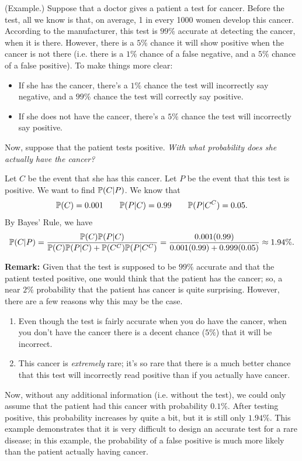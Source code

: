 \begin{mdframed}[]
    (Example.) Suppose that a doctor gives a patient a test for cancer. Before the test, all we know is that, on average, 1 in every 1000 women develop this cancer. According to the manufacturer, this test is $99\%$ accurate at detecting the cancer, when it is there. However, there is a $5\%$ chance it will show positive when the cancer is not there (i.e. there is a $1\%$ chance of a false negative, and a $5\%$ chance of a false positive). To make things more clear:
    \begin{itemize}
        \item If she has the cancer, there's a $1\%$ chance the test will incorrectly say negative, and a $99\%$ chance the test will correctly say positive. 
        \item If she does not have the cancer, there's a $5\%$ chance the test will incorrectly say positive.
    \end{itemize}
    Now, suppose that the patient tests positive. \emph{With what probability does she actually have the cancer?}

    \begin{mdframed}[]
        Let $C$ be the event that she has this cancer. Let $P$ be the event that this test is positive. We want to find $\mathbb{P}(C | P)$. We know that 
        \[\mathbb{P}(C) = 0.001 \qquad \mathbb{P}(P | C) = 0.99 \qquad \mathbb{P}(P | C^C) = 0.05.\]
        By Bayes' Rule, we have 
        \[\mathbb{P}(C | P) = \frac{\mathbb{P}(C) \mathbb{P}(P | C)}{\mathbb{P}(C) \mathbb{P}(P | C) + \mathbb{P}(C^C) \mathbb{P}(P | C^C)} = \frac{0.001(0.99)}{0.001(0.99) + 0.999(0.05)} \approx 1.94\%.\]
    \end{mdframed}
\end{mdframed}
\textbf{Remark:} Given that the test is supposed to be $99\%$ accurate and that the patient tested positive, one would think that the patient has the cancer; so, a near $2\%$ probability that the patient has cancer is quite surprising. However, there are a few reasons why this may be the case.
\begin{enumerate}
    \item Even though the test is fairly accurate when you do have the cancer, when you don't have the cancer there is a decent chance ($5\%$) that it will be incorrect.
    \item This cancer is \emph{extremely} rare; it's so rare that there is a much better chance that this test will incorrectly read positive than if you actually have cancer. 
\end{enumerate}
Now, without any additional information (i.e. without the test), we could only assume that the patient had this cancer with probability $0.1\%$. After testing positive, this probability increases by quite a bit, but it is still only $1.94\%$. This example demonstrates that it is very difficult to design an accurate test for a rare disease; in this example, the probability of a false positive is much more likely than the patient actually having cancer.

